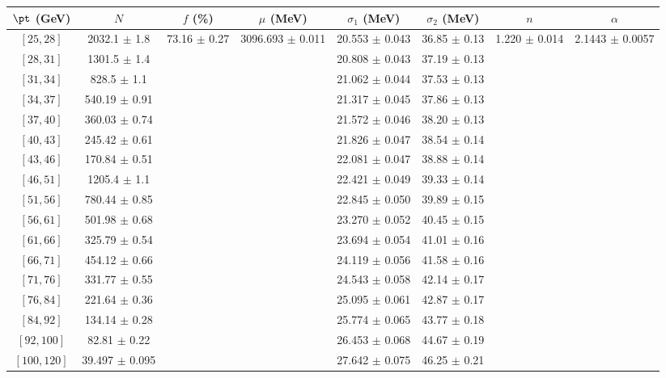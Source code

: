 \begin{tabular}{c||c|c|c|c|c|c|c}
$\pt$ (GeV) & $N$ & $f$ (\%) & $\mu$ (MeV) & $\sigma_1$ (MeV) & $\sigma_2$ (MeV) & $n$ & $\alpha$ \\
\hline
$[25, 28]$ & 2032.1 $\pm$ 1.8 & \multirow{17}{*}{73.16 $\pm$ 0.27} & \multirow{17}{*}{3096.693 $\pm$ 0.011} & 20.553 $\pm$ 0.043 & 36.85 $\pm$ 0.13 & \multirow{17}{*}{1.220 $\pm$ 0.014} & \multirow{17}{*}{2.1443 $\pm$ 0.0057}\\
$[28, 31]$ & 1301.5 $\pm$ 1.4 &  &  & 20.808 $\pm$ 0.043 & 37.19 $\pm$ 0.13 &  & \\
$[31, 34]$ & 828.5 $\pm$ 1.1 &  &  & 21.062 $\pm$ 0.044 & 37.53 $\pm$ 0.13 &  & \\
$[34, 37]$ & 540.19 $\pm$ 0.91 &  &  & 21.317 $\pm$ 0.045 & 37.86 $\pm$ 0.13 &  & \\
$[37, 40]$ & 360.03 $\pm$ 0.74 &  &  & 21.572 $\pm$ 0.046 & 38.20 $\pm$ 0.13 &  & \\
$[40, 43]$ & 245.42 $\pm$ 0.61 &  &  & 21.826 $\pm$ 0.047 & 38.54 $\pm$ 0.14 &  & \\
$[43, 46]$ & 170.84 $\pm$ 0.51 &  &  & 22.081 $\pm$ 0.047 & 38.88 $\pm$ 0.14 &  & \\
$[46, 51]$ & 1205.4 $\pm$ 1.1 &  &  & 22.421 $\pm$ 0.049 & 39.33 $\pm$ 0.14 &  & \\
$[51, 56]$ & 780.44 $\pm$ 0.85 &  &  & 22.845 $\pm$ 0.050 & 39.89 $\pm$ 0.15 &  & \\
$[56, 61]$ & 501.98 $\pm$ 0.68 &  &  & 23.270 $\pm$ 0.052 & 40.45 $\pm$ 0.15 &  & \\
$[61, 66]$ & 325.79 $\pm$ 0.54 &  &  & 23.694 $\pm$ 0.054 & 41.01 $\pm$ 0.16 &  & \\
$[66, 71]$ & 454.12 $\pm$ 0.66 &  &  & 24.119 $\pm$ 0.056 & 41.58 $\pm$ 0.16 &  & \\
$[71, 76]$ & 331.77 $\pm$ 0.55 &  &  & 24.543 $\pm$ 0.058 & 42.14 $\pm$ 0.17 &  & \\
$[76, 84]$ & 221.64 $\pm$ 0.36 &  &  & 25.095 $\pm$ 0.061 & 42.87 $\pm$ 0.17 &  & \\
$[84, 92]$ & 134.14 $\pm$ 0.28 &  &  & 25.774 $\pm$ 0.065 & 43.77 $\pm$ 0.18 &  & \\
$[92, 100]$ & 82.81 $\pm$ 0.22 &  &  & 26.453 $\pm$ 0.068 & 44.67 $\pm$ 0.19 &  & \\
$[100, 120]$ & 39.497 $\pm$ 0.095 &  &  & 27.642 $\pm$ 0.075 & 46.25 $\pm$ 0.21 &  & \\
\end{tabular}
